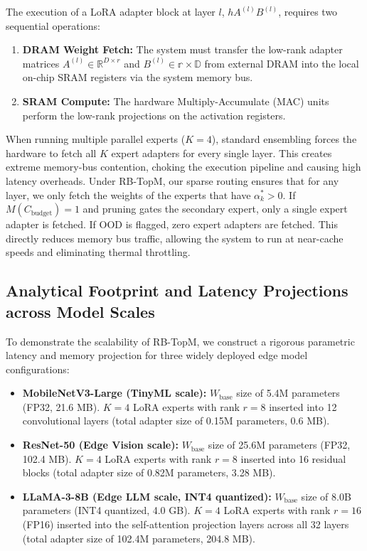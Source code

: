 \documentclass{article}
\theoremstyle{plain}
\theoremstyle{definition}
\theoremstyle{remark}
\begin{document}
The execution of a LoRA adapter block at layer $l$, $h A^{(l)} B^{(l)}$, requires two sequential operations:
\begin{enumerate}
    \item \textbf{DRAM Weight Fetch:} The system must transfer the low-rank adapter matrices $A^{(l)} \in \mathbb{R}^{D \times r}$ and $B^{(l)} \in \mathbb{r \times D}$ from external DRAM into the local on-chip SRAM registers via the system memory bus.
    \item \textbf{SRAM Compute:} The hardware Multiply-Accumulate (MAC) units perform the low-rank projections on the activation registers.
\end{enumerate}

When running multiple parallel experts ($K=4$), standard ensembling forces the hardware to fetch all $K$ expert adapters for every single layer. This creates extreme memory-bus contention, choking the execution pipeline and causing high latency overheads. Under RB-TopM, our sparse routing ensures that for any layer, we only fetch the weights of the experts that have $\alpha^*_k > 0$. If $M(C_{\text{budget}}) = 1$ and pruning gates the secondary expert, only a single expert adapter is fetched. If OOD is flagged, zero expert adapters are fetched. This directly reduces memory bus traffic, allowing the system to run at near-cache speeds and eliminating thermal throttling.

\subsection{Analytical Footprint and Latency Projections across Model Scales}
To demonstrate the scalability of RB-TopM, we construct a rigorous parametric latency and memory projection for three widely deployed edge model configurations:
\begin{itemize}
    \item \textbf{MobileNetV3-Large (TinyML scale):} $W_{\text{base}}$ size of 5.4M parameters (FP32, 21.6 MB). $K=4$ LoRA experts with rank $r=8$ inserted into 12 convolutional layers (total adapter size of 0.15M parameters, 0.6 MB).
    \item \textbf{ResNet-50 (Edge Vision scale):} $W_{\text{base}}$ size of 25.6M parameters (FP32, 102.4 MB). $K=4$ LoRA experts with rank $r=8$ inserted into 16 residual blocks (total adapter size of 0.82M parameters, 3.28 MB).
    \item \textbf{LLaMA-3-8B (Edge LLM scale, INT4 quantized):} $W_{\text{base}}$ size of 8.0B parameters (INT4 quantized, 4.0 GB). $K=4$ LoRA experts with rank $r=16$ (FP16) inserted into the self-attention projection layers across all 32 layers (total adapter size of 102.4M parameters, 204.8 MB).
\end{itemize}
\end{document}
